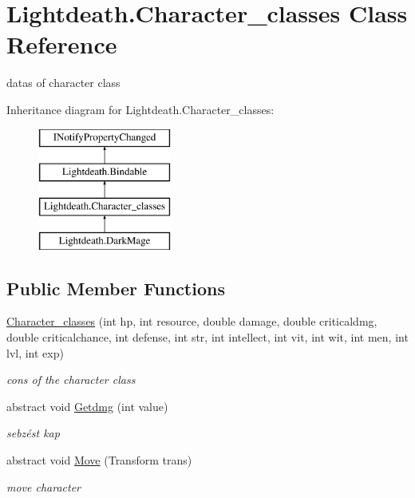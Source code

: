 \hypertarget{class_lightdeath_1_1_character__classes}{}\section{Lightdeath.\+Character\+\_\+classes Class Reference}
\label{class_lightdeath_1_1_character__classes}


datas of character class  


Inheritance diagram for Lightdeath.\+Character\+\_\+classes\+:\begin{figure}[H]
\begin{center}
\leavevmode
\includegraphics[height=4.000000cm]{class_lightdeath_1_1_character__classes}
\end{center}
\end{figure}
\subsection*{Public Member Functions}
\begin{DoxyCompactItemize}
\item 
\hyperlink{class_lightdeath_1_1_character__classes_adb65d30a90c8eca91232c17a93a08018}{Character\+\_\+classes} (int hp, int resource, double damage, double criticaldmg, double criticalchance, int defense, int str, int intellect, int vit, int wit, int men, int lvl, int exp)
\begin{DoxyCompactList}\small\item\em cons of the character class \end{DoxyCompactList}\item 
abstract void \hyperlink{class_lightdeath_1_1_character__classes_a8aca5dd3f39cca87f55ccd333d0dc2ab}{Getdmg} (int value)
\begin{DoxyCompactList}\small\item\em sebzést kap \end{DoxyCompactList}\item 
abstract void \hyperlink{class_lightdeath_1_1_character__classes_a9db6a2c0a9eaf35104b08fcad94f98d4}{Move} (Transform trans)
\begin{DoxyCompactList}\small\item\em move character \end{DoxyCompactList}\end{DoxyCompactItemize}
